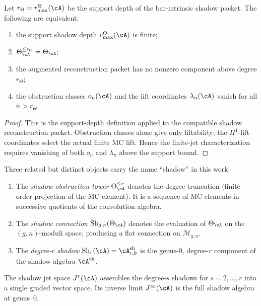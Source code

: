 \begin{theorem}
Let \(r_\Theta=r^\Theta_{\max}(\cA)\) be the support depth of the
bar-intrinsic shadow packet.
The following are equivalent:
\begin{enumerate}[label=\textup{(\roman*)}]
\item the support shadow depth \(r^\Theta_{\max}(\cA)\) is finite;
\item \(\Theta_\cA^{\leq r_\Theta} = \Theta_\cA\);
\item the augmented reconstruction packet has no nonzero component
 above degree \(r_\Theta\);
\item the obstruction classes \(o_n(\cA)\) and the lift coordinates
 \(\lambda_n(\cA)\) vanish for all \(n>r_\Theta\).
\end{enumerate}
\end{theorem}

\begin{proof}
This is the support-depth definition applied to the compatible shadow
reconstruction packet.  Obstruction classes alone give only
liftability; the \(H^1\)-lift coordinates select the actual finite MC
lift.  Hence the finite-jet characterization requires vanishing of
both \(o_n\) and \(\lambda_n\) above the support bound.
\end{proof}

\begin{remark}
Three related but distinct objects carry the name ``shadow'' in this
work:
\begin{enumerate}[label=\textup{(\roman*)}]
\item The \emph{shadow obstruction tower} $\Theta_\cA^{\leq r}$ denotes the
 degree-truncation (finite-order projection of the MC element).
 It is a sequence of MC elements in successive quotients of the
 convolution algebra.
\item The \emph{shadow connection} $\operatorname{Sh}_{g,n}(\Theta_\cA)$
 denotes the evaluation of $\Theta_\cA$ on the $(g,n)$-moduli space,
 producing a flat connection on $\overline{\mathcal{M}}_{g,n}$.
\item The \emph{degree-$r$ shadow} $\operatorname{Sh}_r(\cA) =
 \cA^{\mathrm{sh}}_{r,0}$ is the genus-$0$, degree-$r$ component
 of the shadow algebra $\cA^{\mathrm{sh}}$.
\end{enumerate}
The shadow jet space $J^r(\cA)$ assembles the degree-$s$ shadows for
$s = 2, \ldots, r$ into a single graded vector space. Its inverse
limit $J^\infty(\cA)$ is the full shadow algebra at genus~$0$.
\end{remark}


